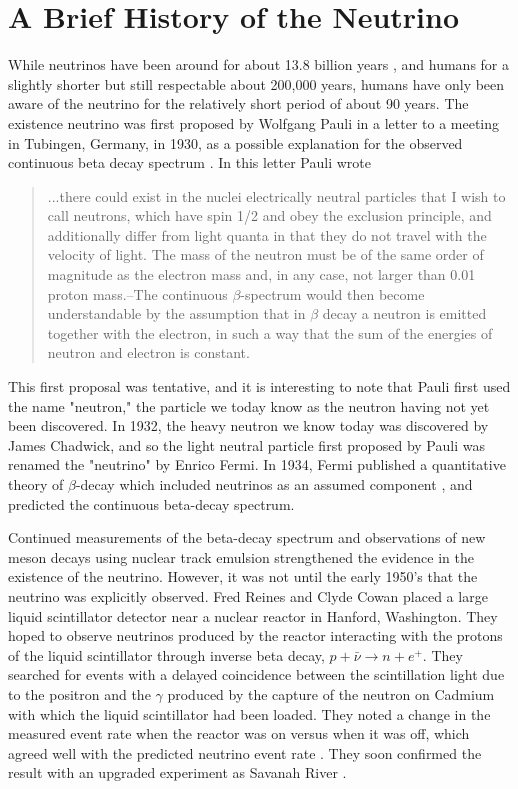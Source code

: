 \section{A Brief History of the Neutrino}
While neutrinos have been around for about 13.8 billion years \cite{PlanckCollaboration:2016cf,Hinshaw:2013dd}, and humans for a slightly shorter but still respectable about 200,000 years, humans have only been aware of the neutrino for the relatively short period of about 90 years.  The existence  neutrino was first proposed by Wolfgang Pauli in a letter to a meeting in Tubingen, Germany, in 1930, as a possible explanation for the observed continuous beta decay spectrum \cite{Brown:1978pb}.  In this letter Pauli wrote
\begin{quote}
...there could exist in the nuclei electrically neutral particles that I wish to call neutrons, which have spin 1/2 and obey the exclusion principle, and additionally differ from light quanta in that they do not travel with the velocity of light.  The mass of the neutron must be of the same order of magnitude as the electron mass and, in any case, not larger than 0.01 proton mass.--The continuous $\beta$-spectrum would then become understandable by the assumption that in $\beta$ decay a neutron is emitted together with the electron, in such a way that the sum of the energies of neutron and electron is constant. \cite{Brown:1978pb}
\end{quote} 
This first proposal was tentative, and it is interesting to note that Pauli first used the name "neutron," the particle we today know as the neutron having not yet been discovered.  In 1932, the heavy neutron we know today was discovered by James Chadwick, and so the light neutral particle first proposed by Pauli was renamed the "neutrino" by Enrico Fermi.  In 1934, Fermi published a quantitative theory of $\beta$-decay which included neutrinos as an assumed component \cite{Fermi:1934hr}, and predicted the continuous beta-decay spectrum.  \par
Continued measurements of the beta-decay spectrum and observations of new meson decays using nuclear track emulsion strengthened the evidence in the existence of the neutrino.  However, it was not until the early 1950's that the neutrino was explicitly observed.  Fred Reines and Clyde Cowan placed a large liquid scintillator detector near a nuclear reactor in Hanford, Washington.  They hoped to observe neutrinos produced by the reactor interacting with the protons of the liquid scintillator through inverse beta decay, $p+\bar{\nu}\rightarrow n+e^+$.  They searched for events with a delayed coincidence between the scintillation light due to the positron and the $\gamma$ produced by the capture of the neutron on Cadmium with which the liquid scintillator had been loaded.  They noted a change in the measured event rate when the reactor was on versus when it was off, which agreed well with the predicted neutrino event rate \cite{Reines:1953pu}.  They soon confirmed the result with an upgraded experiment as Savanah River \cite{Cowan:1992xc,Reines:1956rs}.    